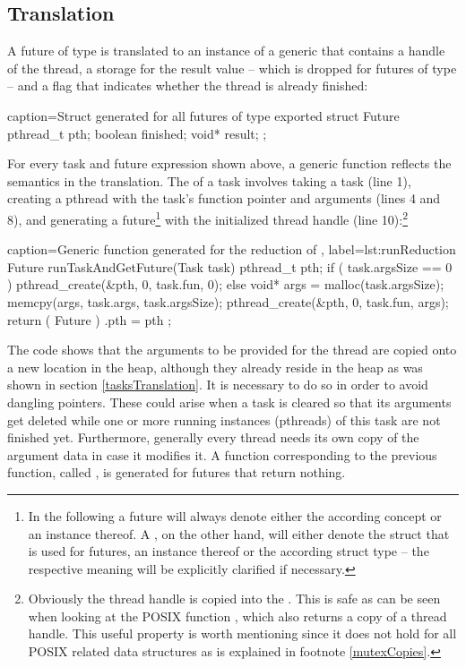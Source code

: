 \subsection{Translation}
\label{futuresTranslation}
A future of type  is translated to an instance of a generic  that contains a handle of the thread, a storage for the result value -- which is dropped for futures of type  -- and a flag that indicates whether the thread is already finished:
\begin{ccode}{caption=Struct generated for all futures of type }
exported struct Future { 
  pthread_t pth; 
  boolean finished; 
  void* result; 
};
\end{ccode}

For every task and future expression shown above, a generic function reflects the semantics in the translation. The  of a task involves taking a task (line 1), creating a pthread with the task's function pointer and arguments (lines 4 and 8), and generating a future\footnote{In the following a future will always denote either the according concept or an instance thereof. A , on the other hand, will either denote the struct that is used for futures, an instance thereof or the according struct type -- the respective meaning will be explicitly clarified if necessary.} with the initialized thread handle (line 10):\footnote{Obviously the thread handle is copied into the . This is safe as can be seen when looking at the POSIX function , which also returns a copy of a thread handle. This useful property is worth mentioning since it does not hold for all POSIX related data structures as is explained in footnote \ref{mutexCopies}.}
\begin{ccode}{caption=Generic function generated for the reduction of , label=lst:runReduction}
Future runTaskAndGetFuture(Task task) { 
  pthread_t pth;
  if ( task.argsSize == 0 ) {
      pthread_create(&pth, 0, task.fun, 0);
  } else {
    void* args = malloc(task.argsSize);
    memcpy(args, task.args, task.argsSize);
    pthread_create(&pth, 0, task.fun, args);
  }
  return ( Future ){ .pth = pth }; 
}
\end{ccode}
The code shows that the arguments to be provided for the thread are copied onto a new location in the heap, although they already reside in the heap as was shown in section \ref{tasksTranslation}. It is necessary to do so in order to avoid dangling pointers. These could arise when a task is cleared so that its arguments get deleted while one or more running instances (pthreads) of this task are not finished yet. Furthermore, generally every thread needs its own copy of the argument data in case it modifies it. A function corresponding to the previous function, called , is generated for futures that return nothing. 


